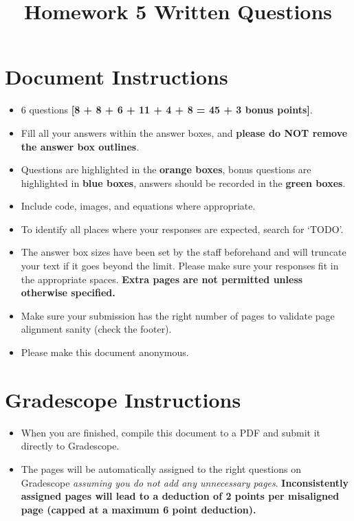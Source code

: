 \date{}

\title{\vspace{-1cm}Homework 5 Written Questions}



\maketitle
\vspace{-3cm}
\thispagestyle{fancy}

\section*{ Document Instructions}
\begin{itemize}

  \item 6 questions \textbf{[8 + 8 + 6 + 11 + 4 + 8 = 45 + 3 bonus points]}.
  \item Fill all your answers within the answer boxes, and \textbf{please do NOT remove the answer box outlines}.
  \item Questions are highlighted in the \textbf{orange boxes}, bonus questions are highlighted in \textbf{blue boxes}, answers should be recorded in the \textbf{green boxes}.
  \item Include code, images, and equations where appropriate.
  \item To identify all places where your responses are expected, search for `TODO'.
  \item The answer box sizes have been set by the staff beforehand and will truncate your text if it goes beyond the limit. Please make sure your responses fit in the appropriate spaces. \textbf{Extra pages are not permitted unless otherwise specified.}
  \item Make sure your submission has the right number of pages to validate page alignment sanity (check the footer).
  \item Please make this document anonymous.
\end{itemize}

\section*{ Gradescope Instructions}
\begin{itemize}
  \item When you are finished, compile this document to a PDF and submit it directly to Gradescope. 
  \item The pages will be automatically assigned to the right questions on Gradescope \textit{assuming you do not add any unnecessary pages}. \textbf{Inconsistently assigned pages will lead to a deduction of 2 points per misaligned page (capped at a maximum 6 point deduction).}
\end{itemize}

